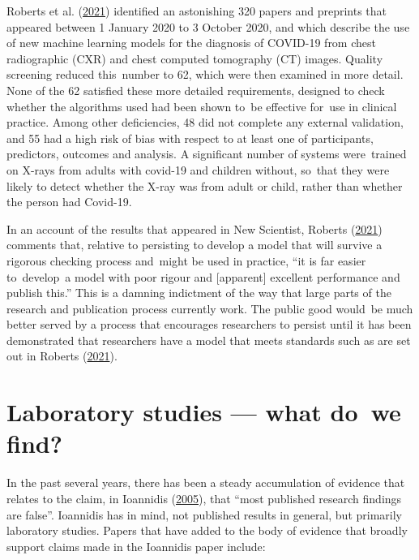\documentclass[
  10pt,
  b5paper]{book}
\begin{document}
Roberts et al. (\protect\hyperlink{ref-roberts2021common}{2021}) identified an astonishing 320 papers and preprints
that appeared between 1 January 2020 to 3 October 2020, and which
describe the use of new machine learning models for the diagnosis of
COVID-19 from chest radiographic (CXR) and chest computed tomography
(CT) images. Quality screening reduced this~number to 62, which were
then examined in more detail. None of the 62 satisfied these more
detailed requirements, designed to check whether the algorithms used
had been shown to~be effective for~use in clinical practice. Among
other deficiencies, 48 did not complete any external validation, and
55 had a high risk of bias with respect to at least one of
participants, predictors, outcomes and analysis. A significant number
of systems were~trained on X-rays from adults with covid-19 and
children without, so~that they were likely to detect whether the
X-ray was from adult or child, rather than whether the person had
Covid-19.

In an account of the results that appeared in New Scientist,
Roberts (\protect\hyperlink{ref-roberts2021AIcovid19}{2021}) comments that, relative to persisting to
develop a model that will survive a rigorous
checking process and~might be used in practice, ``it is far easier
to~develop~a model with poor rigour and {[}apparent{]} excellent
performance and publish this.'' This is a damning indictment of
the way that large parts of the research and publication process
currently work. The public good would~be much better served
by a process that encourages researchers to persist until it
has been demonstrated that researchers have a model that meets
standards such as are set out in Roberts (\protect\hyperlink{ref-roberts2021common}{2021}).

\hypertarget{sec:lab}{%
\section{Laboratory studies --- what do~we find?}\label{sec:lab}}

In the past several years, there has been a steady accumulation
of evidence that relates to the claim, in Ioannidis (\protect\hyperlink{ref-r19_ioannidis_2005}{2005}),
that ``most published research findings are false''. Ioannidis
has in mind, not published results in general, but primarily
laboratory studies. Papers that have added to the
body of evidence that broadly support claims made in the
Ioannidis paper include:
\end{document}
